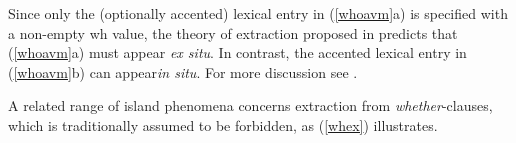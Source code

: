 \documentclass[output=paper
 	        ,biblatex
                ,babelshorthands
                ,newtxmath
                ,draftmode
                ,colorlinks, citecolor=brown
]{langscibook}
\begin{document}
\eal \label{whoavm}



\zl

Since only the (optionally accented) lexical entry in (\ref{whoavm}a) is specified with a 
non-empty {\sc wh} value, the theory of  extraction proposed in \citet{ginzsag} predicts 
that (\ref{whoavm}a) must appear \emph{ex situ}.  In contrast, the accented lexical entry in
 (\ref{whoavm}b)  can  appear\emph{in situ}. For more discussion see  \citet[261]{levhubook}.

A related range of island phenomena concerns extraction from \emph{whether}-clauses, 
which is traditionally assumed to be forbidden, as (\ref{whex}) illustrates.

\eal \label{whex}
\zl 
\end{document}
